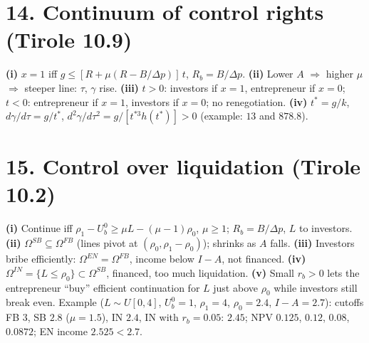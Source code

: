 \documentclass[11pt,a4paper]{article}
\newcommand{\dpp}{\Delta p}
\begin{document}
\section*{14. Continuum of control rights (Tirole 10.9)}
\textbf{(i)} $x=1$ iff $g\le[R+\mu(R-B/\dpp)]\,t$, $R_b=B/\dpp$.
\textbf{(ii)} Lower $A$ $\Rightarrow$ higher $\mu$ $\Rightarrow$ steeper line: $\tau$, $\gamma$ rise.
\textbf{(iii)} $t>0$: investors if $x=1$, entrepreneur if $x=0$; $t<0$: entrepreneur if $x=1$,
investors if $x=0$; no renegotiation.
\textbf{(iv)} $t^*=g/k$, $d\gamma/d\tau=g/t^*$, $d^2\gamma/d\tau^2=g/[t^{*3}h(t^*)]>0$
(example: $13$ and $878.8$).

\section*{15. Control over liquidation (Tirole 10.2)}
\textbf{(i)} Continue iff $\rho_1-U_b^0\ge\mu L-(\mu-1)\rho_0$, $\mu\ge1$; $R_b=B/\dpp$, $L$ to investors.
\textbf{(ii)} $\Omega^{SB}\subseteq\Omega^{FB}$ (lines pivot at $(\rho_0,\rho_1-\rho_0)$); shrinks as
$A$ falls. \textbf{(iii)} Investors bribe efficiently: $\Omega^{EN}=\Omega^{FB}$, income below $I-A$,
not financed. \textbf{(iv)} $\Omega^{IN}=\{L\le\rho_0\}\subset\Omega^{SB}$, financed, too much
liquidation. \textbf{(v)} Small $r_b>0$ lets the entrepreneur ``buy'' efficient continuation for $L$ just
above $\rho_0$ while investors still break even. Example ($L\sim U[0,4]$, $U_b^0=1$, $\rho_1=4$,
$\rho_0=2.4$, $I-A=2.7$): cutoffs FB $3$, SB $2.8$ ($\mu=1.5$), IN $2.4$, IN with $r_b=0.05$: $2.45$;
NPV $0.125$, $0.12$, $0.08$, $0.0872$; EN income $2.525<2.7$.
\end{document}
